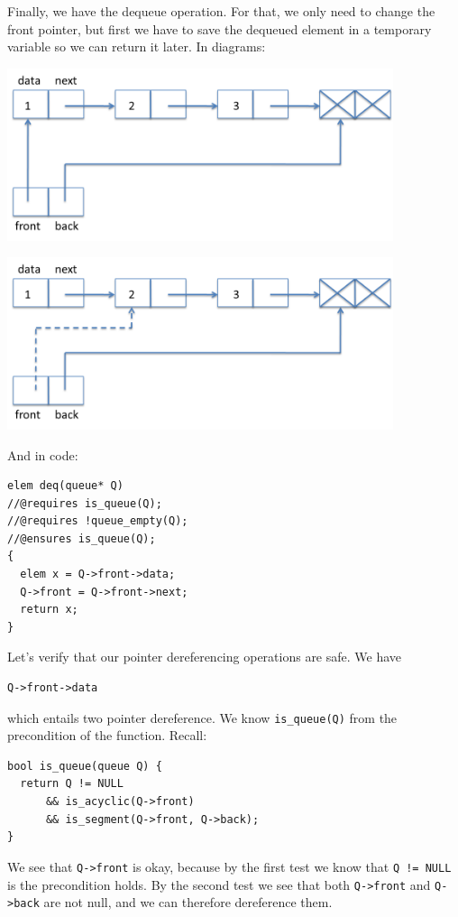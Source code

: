 Finally, we have the dequeue operation.  For that, we only need to
change the front pointer, but first we have to save the dequeued
element in a temporary variable so we can return it later.  In
diagrams:
\begin{center}
\includegraphics[width=0.85\textwidth]{img/queue1.png}
\end{center}
\begin{center}
\includegraphics[width=0.85\textwidth]{img/queue4.png}
\end{center}
And in code:
\begin{lstlisting}[language={[C0]C}]
elem deq(queue* Q)
//@requires is_queue(Q);
//@requires !queue_empty(Q);
//@ensures is_queue(Q);
{
  elem x = Q->front->data;
  Q->front = Q->front->next;
  return x;
}
\end{lstlisting}

\clearpage
\noindent
Let's verify that our pointer dereferencing operations are safe.  We
have
\begin{lstlisting}[language={[C0]C}]
  Q->front->data
\end{lstlisting}
which entails two pointer dereference.  We know \lstinline'is_queue(Q)'
from the precondition of the function.  Recall:
\begin{lstlisting}[language={[C0]C}]
bool is_queue(queue Q) {
  return Q != NULL
      && is_acyclic(Q->front)
      && is_segment(Q->front, Q->back);
}
\end{lstlisting}
We see that \lstinline'Q->front' is okay, because by the first
test we know that \lstinline'Q != NULL' is the precondition holds.
By the second test we see that both \lstinline'Q->front'
and \lstinline'Q->back' are not null, and we can therefore
dereference them.

